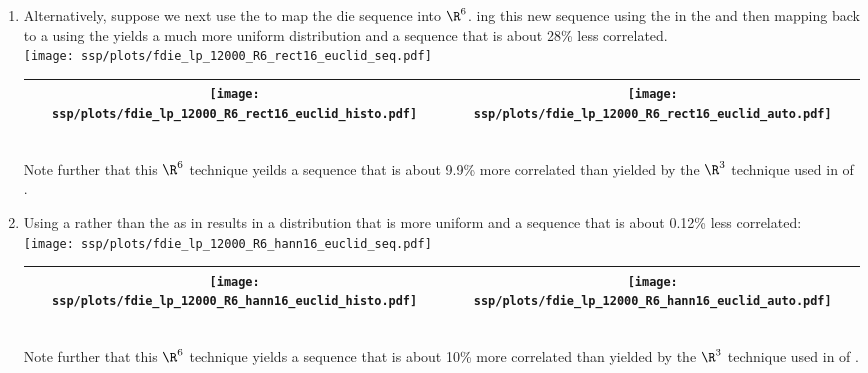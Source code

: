 \begin{example}
\begin{enumerate}
  \item \label{item:fdie_lp_R6_rect16_euclid}
        Alternatively, suppose we next 
        use the  
        to map the die sequence into $\R^6$.
        ing this new sequence using the 
        in the   
        and then mapping back to a  %
        using the  yields a much more uniform distribution and 
        a sequence that is about 28\% less correlated.
        \\\texttt{[image: ssp/plots/fdie\_lp\_12000\_R6\_rect16\_euclid\_seq.pdf]}%
     \\\begin{tabular}{|>{\scs}c|>{\scs}c|}
          \hline
          \texttt{[image: ssp/plots/fdie\_lp\_12000\_R6\_rect16\_euclid\_histo.pdf]}%
         &\texttt{[image: ssp/plots/fdie\_lp\_12000\_R6\_rect16\_euclid\_auto.pdf]}
        \\\hline
     \end{tabular}\\
     Note further that this $\R^6$ technique yeilds a sequence that is about 9.9\% more correlated than 
     yielded by the $\R^3$ technique
     used in  of .

  \item \label{item:fdie_lp_R6_hann16_euclid}
        Using a  rather than the 
         as in 
        results in a distribution that is more uniform and a sequence that is about 0.12\% less correlated:
        \\\texttt{[image: ssp/plots/fdie\_lp\_12000\_R6\_hann16\_euclid\_seq.pdf]}
     \\\begin{tabular}{|>{\scs}c|>{\scs}c|}
          \hline
          \texttt{[image: ssp/plots/fdie\_lp\_12000\_R6\_hann16\_euclid\_histo.pdf]}%
         &\texttt{[image: ssp/plots/fdie\_lp\_12000\_R6\_hann16\_euclid\_auto.pdf]}
        \\\hline
     \end{tabular}\\
     Note further that this $\R^6$ technique yields a sequence that is about 10\% more correlated than 
     yielded by the $\R^3$ technique
     used in  of .


\end{enumerate}
\end{example}
